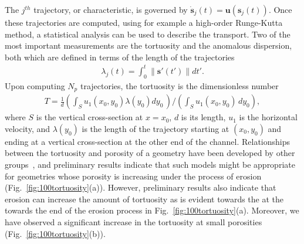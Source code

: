 \documentclass[11pt]{article}
\newcommand{\bvec}[1]{{\mathbf{#1}}}
\newcommand{\uu}{\bvec{u}}
\renewcommand{\ss}{{\mathbf{s}}}
\begin{document}
The $j^{th}$ trajectory, or characteristic, is governed by $\dot{\ss}_j(t) = \uu(\ss_j(t))$. Once these trajectories are computed, using for example a high-order Runge-Kutta method, a statistical analysis can be used to describe the transport. Two of the most important measurements are the tortuosity and the anomalous dispersion, both which are defined in terms of the length of the trajectories \begin{align}
  \lambda_j(t) = \int_{0}^{t} \|\ss'(t')\| dt'.
\end{align}
Upon computing $N_p$ trajectories, the tortuosity is the dimensionless number
\begin{align}
  T = \frac{1}{d} \left(\int_{S} u_1(x_0,y_0)\lambda(y_0) dy_0\, \right)
  \Bigg/ \left(\int_S u_1(x_0,y_0)\, dy_0 \right),
\end{align}
where $S$ is the vertical cross-section at $x=x_0$, $d$ is its length,
$u_1$ is the horizontal velocity, and $\lambda(y_0)$ is the length of
the trajectory starting at $(x_0,y_0)$ and ending at a vertical
cross-section at the other end of the channel. Relationships between the
tortuosity and porosity of a geometry have been developed by other
groups~\cite{kop-kat-tim1996, dud-koz-mat2011, mat-kha-koz2008}, and
preliminary results indicate that such models might be appropriate for
geometries whose porosity is increasing under the process of erosion
(Fig.~\ref{fig:100tortuosity}(a)). However, preliminary results also
indicate that erosion can increase the amount of tortuosity as is
evident towards the at the towards the end of the erosion process in
Fig.~\ref{fig:100tortuosity}(a). Moreover, we have observed a
significant increase in the tortuosity at small porosities
(Fig.~\ref{fig:100tortuosity}(b)).
\end{document}
